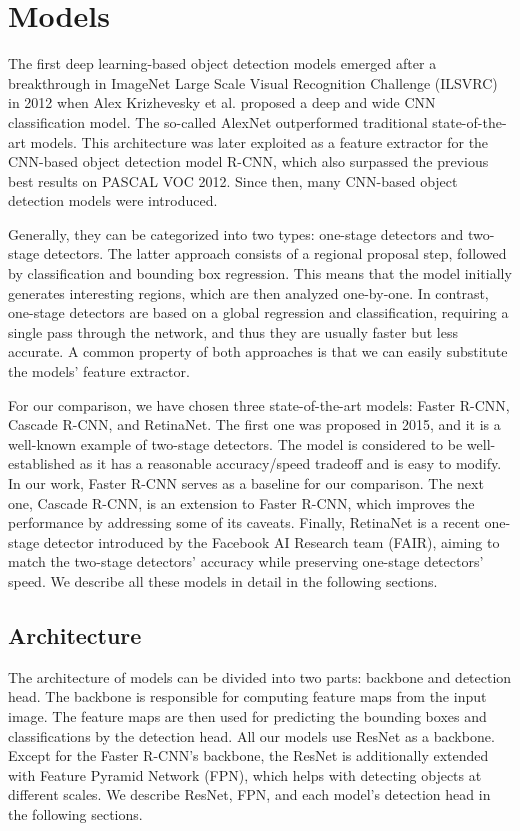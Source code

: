 \chapter{Models}
The first deep learning-based object detection models emerged after a breakthrough in ImageNet Large Scale Visual Recognition Challenge (ILSVRC) in 2012 when Alex Krizhevesky et al. proposed a deep and wide CNN classification model. The so-called AlexNet outperformed traditional state-of-the-art models.  This architecture was later exploited as a feature extractor for the CNN-based object detection model R-CNN, which also surpassed the previous best results on PASCAL VOC 2012. Since then, many CNN-based object detection models were introduced.

Generally, they can be categorized into two types: one-stage detectors and two-stage detectors. The latter approach consists of a regional proposal step, followed by classification and bounding box regression. This means that the model initially generates interesting regions, which are then analyzed one-by-one. In contrast, one-stage detectors are based on a global regression and classification, requiring a single pass through the network, and thus they are usually faster but less accurate. A common property of both approaches is that we can easily substitute the models' feature extractor. 

For our comparison, we have chosen three state-of-the-art models: Faster R-CNN, Cascade R-CNN, and RetinaNet. The first one was proposed in 2015, and it is a well-known example of two-stage detectors. The model is considered to be well-established as it has a reasonable accuracy/speed tradeoff and is easy to modify. In our work, Faster R-CNN serves as a baseline for our comparison. The next one, Cascade R-CNN, is an extension to Faster R-CNN, which improves the performance by addressing some of its caveats. Finally, RetinaNet is a recent one-stage detector introduced by the Facebook AI Research team (FAIR), aiming to match the two-stage detectors' accuracy while preserving one-stage detectors' speed. We describe all these models in detail in the following sections.

\section{Architecture}
The architecture of models can be divided into two parts: backbone and detection head. The backbone is responsible for computing feature maps from the input image. The feature maps are then used for predicting the bounding boxes and classifications by the detection head. All our models use ResNet as a backbone. Except for the Faster R-CNN's backbone, the ResNet is additionally extended with Feature Pyramid Network (FPN), which helps with detecting objects at different scales. We describe ResNet, FPN, and each model's detection head in the following sections.


